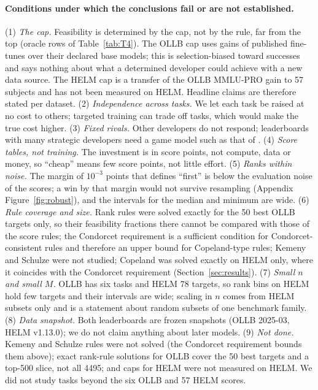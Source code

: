 \documentclass{article}
\begin{document}
\paragraph{Conditions under which the conclusions fail or are not established.}
(1) \emph{The cap.} Feasibility is determined by the cap, not by the rule, far from the top (oracle rows of Table~\ref{tab:T4}). The OLLB cap uses gains of published fine-tunes over their declared base models; this is selection-biased toward successes and says nothing about what a determined developer could achieve with a new data source. The HELM cap is a transfer of the OLLB MMLU-PRO gain to 57 subjects and has not been measured on HELM. Headline claims are therefore stated per dataset. (2) \emph{Independence across tasks.} We let each task be raised at no cost to others; targeted training can trade off tasks, which would make the true cost higher. (3) \emph{Fixed rivals.} Other developers do not respond; leaderboards with many strategic developers need a game model such as that of \citet{chen2026incentives}. (4) \emph{Score tables, not training.} The investment is in score points, not compute, data or money, so ``cheap'' means few score points, not little effort. (5) \emph{Ranks within noise.} The margin of $10^{-3}$ points that defines ``first'' is below the evaluation noise of the scores; a win by that margin would not survive resampling (Appendix Figure~\ref{fig:robust}), and the intervals for the median and minimum are wide. (6) \emph{Rule coverage and size.} Rank rules were solved exactly for the 50 best OLLB targets only, so their feasibility fractions there cannot be compared with those of the score rules; the Condorcet requirement is a sufficient condition for Condorcet-consistent rules and therefore an upper bound for Copeland-type rules; Kemeny and Schulze were not studied; Copeland was solved exactly on HELM only, where it coincides with the Condorcet requirement (Section~\ref{sec:results}). (7) \emph{Small $n$ and small $M$.} OLLB has six tasks and HELM 78 targets, so rank bins on HELM hold few targets and their intervals are wide; scaling in $n$ comes from HELM subsets only and is a statement about random subsets of one benchmark family. (8) \emph{Data snapshot.} Both leaderboards are frozen snapshots (OLLB 2025-03, HELM v1.13.0); we do not claim anything about later models. (9) \emph{Not done.} Kemeny and Schulze rules were not solved (the Condorcet requirement bounds them above); exact rank-rule solutions for OLLB cover the 50 best targets and a top-500 slice, not all 4495; and caps for HELM were not measured on HELM. We did not study tasks beyond the six OLLB and 57 HELM scores.
\end{document}
